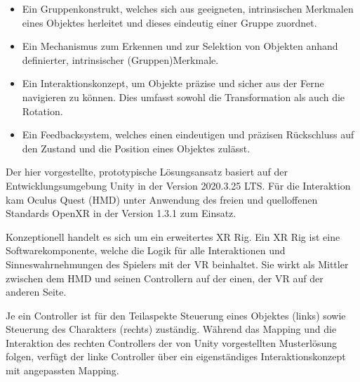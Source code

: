 \documentclass[25pt, a0paper, portrait, margin=0mm, innermargin=15mm,blockverticalspace=15mm, colspace=15mm, subcolspace=8mm, ngerman]{tikzposter}
\begin{document}
\begin{columns}
\begin{subcolumns}
{            \vspace{1em}
            
            \begin{itemize}
                
                \item Ein Gruppenkonstrukt, welches sich aus geeigneten, intrinsischen Merkmalen eines Objektes herleitet und dieses eindeutig einer Gruppe zuordnet.
                
                \item Ein Mechanismus zum Erkennen und zur Selektion von Objekten anhand definierter, intrinsischer (Gruppen)Merkmale.
          
                \item Ein Interaktionskonzept, um Objekte präzise und sicher aus der Ferne navigieren zu können. Dies umfasst sowohl die Transformation als auch die Rotation.

                \item Ein Feedbacksystem, welches einen eindeutigen und präzisen Rückschluss auf den Zustand und die Position eines Objektes zulässt.

            \end{itemize}
            
            \vspace{-2cm}
        }
          
        {
            Der hier vorgestellte, prototypische Lösungsansatz basiert auf der Entwicklungsumgebung Unity \cite{Unity} in der Version 2020.3.25 LTS. Für die Interaktion kam Oculus Quest (HMD) unter Anwendung des freien und quelloffenen Standards OpenXR \cite{Khronos} in der Version 1.3.1 zum Einsatz.
            
            \vspace{1em}

            Konzeptionell handelt es sich um ein erweitertes XR Rig. Ein XR Rig ist eine Softwarekomponente, welche die Logik für alle Interaktionen und Sinneswahrnehmungen des Spielers mit der VR beinhaltet. Sie wirkt als Mittler zwischen dem HMD und seinen Controllern auf der einen, der VR auf der anderen Seite.
        
            \vspace{1em}
            
            Je ein Controller ist für den Teilaspekte Steuerung eines Objektes (links) sowie Steuerung des Charakters (rechts) zuständig. Während das Mapping und die Interaktion des rechten Controllers der von Unity vorgestellten Musterlösung folgen, verfügt der linke Controller über ein eigenständiges Interaktionskonzept mit angepassten Mapping.

}
\end{subcolumns}
\end{columns}
\end{document}

